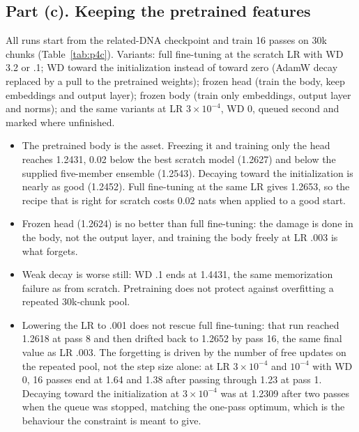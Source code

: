 \subsection*{Part (c). Keeping the pretrained features}

 All runs start from the related-DNA checkpoint and train 16 passes on 30k chunks (Table~\ref{tab:p4c}). Variants: full fine-tuning at the scratch LR with WD 3.2 or .1; WD toward the initialization instead of toward zero (AdamW decay replaced by a pull to the pretrained weights); frozen head (train the body, keep embeddings and output layer); frozen body (train only embeddings, output layer and norms); and the same variants at LR $3\times10^{-4}$, WD 0, queued second and marked where unfinished.
\begin{itemize}
\item The pretrained body is the asset. Freezing it and training only the head reaches 1.2431, 0.02 below the best scratch model (1.2627) and below the supplied five-member ensemble (1.2543). Decaying toward the initialization is nearly as good (1.2452). Full fine-tuning at the same LR gives 1.2653, so the recipe that is right for scratch costs 0.02 nats when applied to a good start.
\item Frozen head (1.2624) is no better than full fine-tuning: the damage is done in the body, not the output layer, and training the body freely at LR .003 is what forgets.
\item Weak decay is worse still: WD .1 ends at 1.4431, the same memorization failure as from scratch. Pretraining does not protect against overfitting a repeated 30k-chunk pool.
\item Lowering the LR to .001 does not rescue full fine-tuning: that run reached 1.2618 at pass 8 and then drifted back to 1.2652 by pass 16, the same final value as LR .003. The forgetting is driven by the number of free updates on the repeated pool, not the step size alone: at LR $3\times10^{-4}$ and $10^{-4}$ with WD 0, 16 passes end at 1.64 and 1.38 after passing through 1.23 at pass 1. Decaying toward the initialization at $3\times10^{-4}$ was at 1.2309 after two passes when the queue was stopped, matching the one-pass optimum, which is the behaviour the constraint is meant to give.
\end{itemize}
